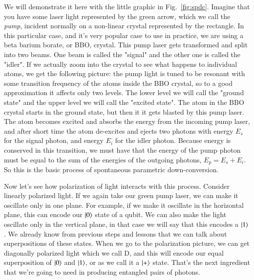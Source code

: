 We will demonstrate it here with the little graphic in Fig.~\ref{fig:spdc}. Imagine that you have some laser light
represented by the green arrow, which we call the \emph{pump}, incident normally on a non-linear crystal represented by the rectangle. In this particular case, and it's very popular case to use in practice, we are using a beta barium borate, or BBO, crystal. This pump laser gets transformed and split into two beams. One beam is called the "signal" and the other one is called the "idler". If we actually zoom into the crystal to see what happens to individual atoms, we get the following picture: the pump light is tuned to be resonant with some transition frequency of the atoms inside the BBO crystal, so to a good approximation it affects only two levels. The lower level we will call the "ground state" and the upper level we will call the "excited state". The atom in the BBO crystal starts in the ground state, but then it it gets blasted by this pump laser.  The atom becomes excited and absorbs the energy from the incoming pump laser, and after short time the atom de-excites and ejects two photons with energy $E_s$ for the signal photon, and energy $E_i$ for the idler photon.  Because energy is conserved in this transition, we must have that the energy of the pump photon must be equal to the sum of the energies of the outgoing photons, $E_p = E_s + E_i$. So this is the basic process of spontaneous parametric down-conversion.

Now let's see how polarization of light interacts with this process. Consider linearly polarized light. If we again take our green pump laser, we can make it oscillate only in one plane. For example, if we make it oscillate in the horizontal plane, this can encode our $\ket{0}$ state of a qubit. We can also make the light oscillate only in the vertical plane, in that case we will say that this encodes a $\ket{1}$. We already know from previous steps and lessons that we can talk about superpositions of these states. When we go to the polarization picture, we can get diagonally polarized light which we call D, and this will encode our equal superposition of $\ket{0}$ and $\ket{1}$, or as we call it a $\ket{+}$ state. That's the next ingredient that we're going to need in producing entangled pairs of photons.

